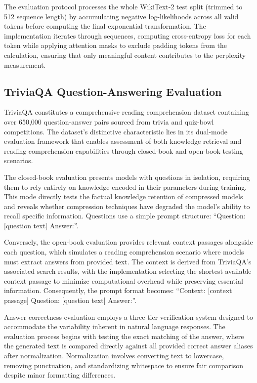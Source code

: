 The evaluation protocol processes the whole WikiText-2 test split (trimmed to 512 sequence length) by accumulating negative log-likelihoods across all valid tokens before computing the final exponential transformation. The implementation iterates through sequences, computing cross-entropy loss for each token while applying attention masks to exclude padding tokens from the calculation, ensuring that only meaningful content contributes to the perplexity measurement.

\subsection{TriviaQA Question-Answering Evaluation}

TriviaQA \cite{triviaqa} constitutes a comprehensive reading comprehension dataset containing over 650,000 question-answer pairs sourced from trivia and quiz-bowl competitions. The dataset's distinctive characteristic lies in its dual-mode evaluation framework that enables assessment of both knowledge retrieval and reading comprehension capabilities through closed-book and open-book testing scenarios.

The closed-book evaluation presents models with questions in isolation, requiring them to rely entirely on knowledge encoded in their parameters during training. This mode directly tests the factual knowledge retention of compressed models and reveals whether compression techniques have degraded the model's ability to recall specific information. Questions use a simple prompt structure: ``Question: [question text] Answer:''.

Conversely, the open-book evaluation provides relevant context passages alongside each question, which simulates a reading comprehension scenario where models must extract answers from provided text. The context is derived from TriviaQA's associated search results, with the implementation selecting the shortest available context passage to minimize computational overhead while preserving essential information. Consequently, the prompt format becomes: ``Context: [context passage] Question: [question text] Answer:''.

Answer correctness evaluation employs a three-tier verification system designed to accommodate the variability inherent in natural language responses. The evaluation process begins with testing the exact matching of the answer, where the generated text is compared directly against all provided correct answer aliases after normalization. Normalization involves converting text to lowercase, removing punctuation, and standardizing whitespace to ensure fair comparison despite minor formatting differences.

